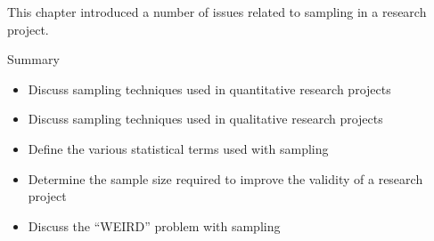 This chapter introduced a number of issues related to sampling in a research project. 

\begin{center}
	\begin{tkawybox}{Summary}
		\begin{itemize}
			\setlength{\itemsep}{0pt}
			\setlength{\parskip}{0pt}
			\setlength{\parsep}{0pt}
			
			\item Discuss sampling techniques used in quantitative research projects
			\item Discuss sampling techniques used in qualitative research 		projects
			\item Define the various statistical terms used with sampling
			\item Determine the sample size required to improve the validity of a research project
			\item Discuss the ``WEIRD'' problem with sampling
		\end{itemize}
	\end{tkawybox}
\end{center}
